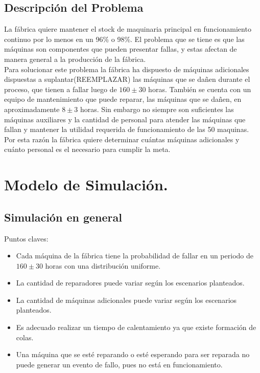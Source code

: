 \documentclass[10pt]{article}
\begin{document}
\subsection{Descripción del Problema}

La fábrica quiere mantener el stock de maquinaria principal en funcionamiento continuo por lo menos en un 96\% o 98\%. El problema que se tiene es que las máquinas son componentes que pueden presentar fallas, y estas afectan de manera general a la producción de la fábrica.\\

Para solucionar este problema la fábrica ha dispuesto de máquinas adicionales dispuestas a suplantar(REEMPLAZAR) las máquinas que se dañen durante el proceso, que tienen a fallar luego de $160\pm30$ horas. También se cuenta con un equipo de mantenimiento que puede reparar, las máquinas que se dañen, en aproximadamente $8\pm3$ horas. Sin embargo no siempre son suficientes las máquinas auxiliares y la cantidad de personal para atender las máquinas que fallan y mantener la utilidad requerida de funcionamiento de las 50 maquinas. Por esta razón la fábrica quiere determinar cuántas máquinas adicionales y cuánto personal es el necesario para cumplir la meta.

\section{Modelo de Simulación.}

\subsection{Simulación en general}

Puntos claves:
\begin{itemize}
\item Cada máquina de la fábrica tiene la probabilidad de fallar en un periodo de $160\pm30$ horas con una distribución uniforme.
\item La cantidad de reparadores puede variar según los escenarios planteados.
\item La cantidad de máquinas adicionales puede variar según los escenarios planteados.
\item Es adecuado realizar un tiempo de calentamiento ya que existe formación de colas.
\item Una máquina que se esté reparando o esté esperando para ser reparada no puede generar un evento de fallo, pues no está en funcionamiento. 
\end{itemize}
\end{document}
